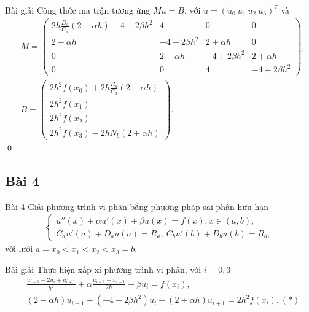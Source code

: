 \documentclass[9pt]{beamer}
\begin{document}
\begin{frame}
    \begin{exampleblock}{Bài giải}
    Công thức ma trận tương ứng $Mu = B$, với $u = (u_0 \  u_1 \  u_2 \  u_3)^T$ và
    \begin{align*}
        & M = \begin{pmatrix}
        2h\frac{D_a}{C_a}(2 - \alpha h) - 4 + 2\beta h^2 & 4 & 0 & 0 \\
        2 - \alpha h & -4 + 2\beta h^2 & 2 + \alpha h & 0 \\
        0 & 2 - \alpha h & -4 + 2\beta h^2 & 2 + \alpha h \\
        0 & 0 & 4 & -4 + 2\beta h^2
        \end{pmatrix}, \\
        & B = \begin{pmatrix}
        2h^2f(x_0) + 2h\frac{R_a}{C_a}(2 - \alpha h) \\
        2h^2f(x_1) \\
        2h^2f(x_2) \\
        2h^2f(x_3) - 2h N_b(2 + \alpha h)
        \end{pmatrix}.
    \end{align*} \hill \qed
    \end{exampleblock}
\end{frame}

\subsection{Bài 4}

\begin{frame}
    \begin{block}{Bài 4}
    Giải phương trình vi phân bằng phương pháp sai phân hữu hạn
    \begin{align*}
        \begin{cases}
        u''(x) + \alpha u'(x) + \beta u(x) = f(x), x \in (a,b), \\
        C_a u'(a) + D_a u(a) = R_a, \  C_b u'(b) + D_b u(b) = R_b,
        \end{cases}
    \end{align*}
    với lưới $a = x_0 < x_1 < x_2 < x_3 = b$.
    \end{block}
    \begin{exampleblock}{Bài giải}
    Thực hiện xấp xỉ phương trình vi phân, với $i = \overline{0,3}$
    \begin{align*}
        & \frac{u_{i-1} - 2u_i + u_{i+1}}{h^2} + \alpha \frac{u_{i+1} - u_{i-1}}{2h} + \beta u_i = f(x_i), \\
        & (2 - \alpha h) u_{i-1} + (-4 + 2\beta h^2) u_i + (2 + \alpha h) u_{i+1} = 2h^2 f(x_i). \ (*)
    \end{align*}
    \end{exampleblock}
\end{frame}
\end{document}

